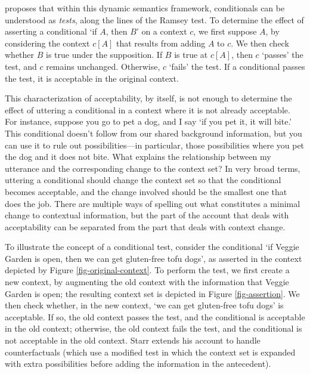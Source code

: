 \citet{Starr2014-STAAUT-2} proposes that within this dynamic semantics framework, conditionals can be understood as \emph{tests}, along the lines of the Ramsey test.  To determine the effect of asserting a conditional `if $A$, then $B$' on a context $c$, we first suppose $A$, by considering the context $c[A]$ that results from adding $A$ to $c$.  We then check whether $B$ is true under the supposition.  If $B$ is true at $c[A]$, then $c$ `passes' the test, and $c$ remains unchanged.  Otherwise, $c$ `fails' the test.  If a conditional passes the test, it is acceptable in the original context.

This characterization of acceptability, by itself, is not enough to determine the effect of uttering a conditional in a context where it is not already acceptable.  For instance, suppose you go to pet a dog, and I say `if you pet it, it will bite.'  This conditional doesn't follow from our shared background information, but you can use it to rule out possibilities---in particular, those possibilities where you pet the dog and it does not bite.  What explains the relationship between my utterance and the corresponding change to the context set?  In very broad terms, uttering a conditional should change the context set so that the conditional becomes acceptable, and the change involved should be the smallest one that does the job.  There are multiple ways of spelling out what constitutes a minimal change to contextual information, but the part of the account that deals with acceptability can be separated from the part that deals with context change.

To illustrate the concept of a conditional test, consider the conditional `if Veggie Garden is open, then we can get gluten-free tofu dogs', as asserted in the context depicted by Figure \ref{fig-original-context}.  To perform the test, we first create a new context, by augmenting the old context with the information that Veggie Garden is open; the resulting context set is depicted in Figure \ref{fig-assertion}.  We then check whether, in the new context, `we can get gluten-free tofu dogs' is acceptable.  If so, the old context passes the test, and the conditional is acceptable in the old context; otherwise, the old context fails the test, and the conditional is not acceptable in the old context. Starr extends his account to handle counterfactuals (which use a modified test in which the context set is expanded with extra possibilities before adding the information in the antecedent).

